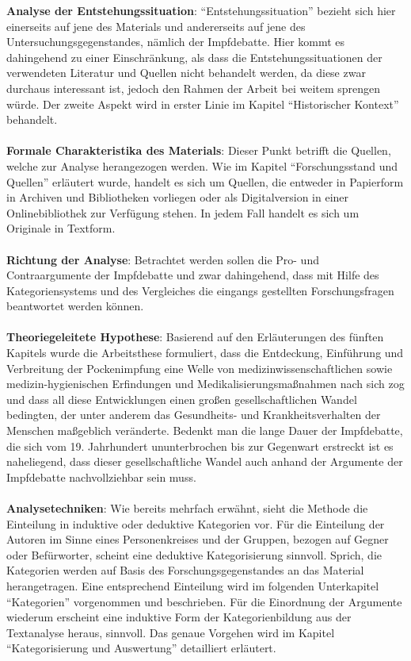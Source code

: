 \documentclass[
    a4paper,
    12pt,
    hyphens,
    chapterprefix=true,
    headheight=33pt,
    footheight=29pt,
    headings=optiontohead, %
]{scrartcl}
\begin{document}
\textbf{Analyse der Entstehungssituation}: "`Entstehungssituation"' bezieht sich hier einerseits auf jene des Materials und andererseits auf jene des Untersuchungsgegenstandes, nämlich der Impfdebatte.  Hier kommt es dahingehend zu einer Einschränkung, als dass die Entstehungssituationen der verwendeten Literatur und Quellen nicht behandelt werden, da diese zwar durchaus interessant ist, jedoch den Rahmen der Arbeit bei weitem sprengen würde. Der zweite Aspekt wird in erster Linie im Kapitel "`Historischer Kontext"' behandelt.\\
\\
\textbf{Formale Charakteristika des Materials}: Dieser Punkt betrifft die Quellen, welche zur Analyse herangezogen werden. Wie im Kapitel "`Forschungsstand und Quellen"' erläutert wurde, handelt es sich um Quellen, die entweder in Papierform in Archiven und Bibliotheken vorliegen oder als Digitalversion in einer Onlinebibliothek zur Verfügung stehen. In jedem Fall handelt es sich um Originale in Textform.\\
\\
\textbf{Richtung der Analyse}: Betrachtet werden sollen die Pro- und Contraargumente der Impfdebatte und zwar dahingehend, dass mit Hilfe des Kategoriensystems und des Vergleiches die eingangs gestellten Forschungsfragen beantwortet werden können.\\
\\
\textbf{Theoriegeleitete Hypothese}: Basierend auf den Erläuterungen des fünften Kapitels wurde die Arbeitsthese formuliert, dass die Entdeckung, Einführung und Verbreitung der Pockenimpfung eine Welle von medizinwissenschaftlichen sowie medizin-hygienischen Erfindungen und Medikalisierungsmaßnahmen nach sich zog und dass all diese Entwicklungen einen großen gesellschaftlichen Wandel bedingten, der unter anderem das Gesundheits- und Krankheitsverhalten der Menschen maßgeblich veränderte. Bedenkt man die lange Dauer der Impfdebatte, die sich vom 19. Jahrhundert ununterbrochen bis zur Gegenwart erstreckt ist es naheliegend, dass dieser gesellschaftliche Wandel auch anhand der Argumente der Impfdebatte nachvollziehbar sein muss.\\
\\
\textbf{Analysetechniken}: Wie bereits mehrfach erwähnt, sieht die Methode die Einteilung in induktive oder deduktive Kategorien vor. Für die Einteilung der Autoren im Sinne eines Personenkreises und der Gruppen, bezogen auf Gegner oder Befürworter, scheint eine deduktive Kategorisierung sinnvoll. Sprich, die Kategorien werden auf Basis des Forschungsgegenstandes an das Material herangetragen. Eine entsprechend Einteilung wird im folgenden Unterkapitel "`Kategorien"' vorgenommen und beschrieben. Für die Einordnung der Argumente wiederum erscheint eine induktive Form der Kategorienbildung aus der Textanalyse heraus, sinnvoll. Das genaue Vorgehen wird im Kapitel "`Kategorisierung und Auswertung"' detailliert erläutert. \\
\end{document}
